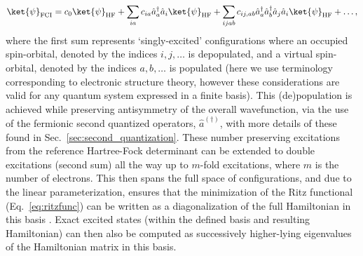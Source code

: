 \begin{equation} \label{eq:CI_wf}
    \ket{\psi}_{\text{FCI}} = c_0 \ket{\psi}_{\text{HF}} + \sum_{ia} c_{ia} \hat{a}_a^{\dagger} \hat{a}_i \ket{\psi}_{\text{HF}} + \sum_{ijab} c_{ij, ab} \hat{a}_a^{\dagger} \hat{a}_b^{\dagger} \hat{a}_j \hat{a}_i \ket{\psi}_{\text{HF}} + \dots ,
\end{equation}
where the first sum represents `singly-excited' configurations where an occupied spin-orbital, denoted by the indices $i, j, \dots$ is depopulated, and a virtual spin-orbital, denoted by the indices $a, b, \dots$ is populated (here we use terminology corresponding to electronic structure theory, however these considerations are valid for any quantum system expressed in a finite basis). This (de)population is achieved while preserving antisymmetry of the overall wavefunction, via the use of the fermionic second quantized operators, $\hat{a}^{(\dagger)}$, with more details of these found in Sec.~\ref{sec:second_quantization}. These number preserving excitations from the reference Hartree-Fock determinant can be extended to double excitations (second sum) all the way up to $m$-fold excitations, where $m$ is the number of electrons. This then spans the full space of configurations, and due to the linear parameterization, ensures that the minimization of the Ritz functional (Eq.~\ref{eq:ritzfunc}) can be written as a diagonalization of the full Hamiltonian in this basis \cite{Ross1952,Foresman1996}. Exact excited states (within the defined basis and resulting Hamiltonian) can then also be computed as successively higher-lying eigenvalues of the Hamiltonian matrix in this basis. 

